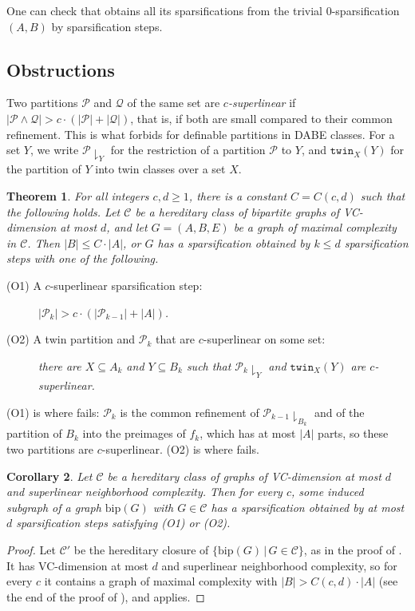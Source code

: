 \documentclass[11pt]{article}
\newtheorem{theorem}{Theorem}
\newtheorem{corollary}[theorem]{Corollary}
\theoremstyle{definition}
\newcommand{\CC}{{\mathscr C}}
\renewcommand{\le}{\leqslant}
\renewcommand{\ge}{\geqslant}
\newcommand{\set}[1]{\{#1\}}
\newcommand{\setof}[2]{\set{#1 \,|\, #2 }}
\newcommand{\res}[1]{{\downharpoonright}_{#1}}
\newcommand{\Pp}{\mathcal{P}}
\newcommand{\Qq}{\mathcal{Q}}
\newcommand{\remph}[1]{{\color{red} \emph{#1}}}
\newcommand{\twin}{\mathtt{twin}}
\begin{document}
One can check that  obtains all its sparsifications from the trivial $0$-sparsification $(A, B)$ by sparsification steps.

\subsection{Obstructions}

Two partitions $\Pp$ and $\Qq$ of the same set are \remph{$c$-superlinear} if $|\Pp \wedge \Qq| > c \cdot (|\Pp| + |\Qq|)$, that is, if both are small compared to their common refinement.
This is what  forbids for definable partitions in DABE classes.
For a set $Y$, we write $\Pp \res Y$ for the restriction of a partition $\Pp$ to $Y$, and $\twin_X(Y)$ for the partition of $Y$ into twin classes over a set $X$.

\begin{theorem}\label{thm:obstructions}
For all integers $c, d \ge 1$, there is a constant $C = C(c, d)$ such that the following holds.
Let $\CC$ be a hereditary class of bipartite graphs of VC-dimension at most $d$, and let $G = (A, B, E)$ be a graph of maximal complexity in $\CC$.
Then $|B| \le C \cdot |A|$, or $G$ has a sparsification obtained by $k \le d$ sparsification steps with one of the following.
\begin{description}
  \item[(O1) A $c$-superlinear sparsification step:] $|\Pp_k| > c \cdot (|\Pp_{k-1}| + |A|)$.
  \item[(O2) A twin partition and $\Pp_k$ that are $c$-superlinear on some set:] there are $X \subseteq A_k$ and $Y \subseteq B_k$ such that $\Pp_k \res Y$ and $\twin_X(Y)$ are $c$-superlinear.
\end{description}
\end{theorem}

(O1) is where  fails: $\Pp_k$ is the common refinement of $\Pp_{k-1} \res {B_k}$ and of the partition of $B_k$ into the preimages of $f_k$, which has at most $|A|$ parts, so these two partitions are $c$-superlinear.
(O2) is where  fails.

\begin{corollary}\label{cor:obstructions}
Let $\CC$ be a hereditary class of graphs of VC-dimension at most $d$ and superlinear neighborhood complexity.
Then for every $c$, some induced subgraph of a graph $\text{bip}(G)$ with $G \in \CC$ has a sparsification obtained by at most $d$ sparsification steps satisfying (O1) or (O2).
\end{corollary}
\begin{proof}
Let $\CC'$ be the hereditary closure of $\setof{\text{bip}(G)}{G \in \CC}$, as in the proof of .
It has VC-dimension at most $d$ and superlinear neighborhood complexity, so for every $c$ it contains a graph of maximal complexity with $|B| > C(c, d) \cdot |A|$ (see the end of the proof of ), and  applies.
\end{proof}
\end{document}
